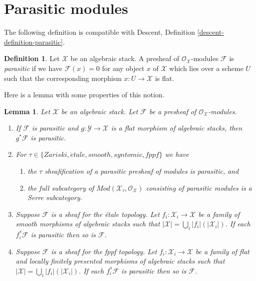 \documentclass{stacks-project}
\theoremstyle{plain}
\newtheorem{lemma}[subsection]{Lemma}
\theoremstyle{definition}
\newtheorem{definition}[subsection]{Definition}
\theoremstyle{remark}
\numberwithin{equation}{subsection}
\def\etale{{\acute{e}tale}}
\begin{document}
\section{Parasitic modules}
\label{section-parasitic}

\noindent
The following definition is compatible with
Descent, Definition \ref{descent-definition-parasitic}.

\begin{definition}
\label{definition-parasitic}
Let $\mathcal{X}$ be an algebraic stack.
A presheaf of $\mathcal{O}_\mathcal{X}$-modules $\mathcal{F}$ is
{\it parasitic} if we have $\mathcal{F}(x) = 0$ for any object $x$
of $\mathcal{X}$ which lies over a scheme $U$ such that the corresponding
morphism $x : U \to \mathcal{X}$ is flat.
\end{definition}

\noindent
Here is a lemma with some properties of this notion.

\begin{lemma}
\label{lemma-parasitic}
Let $\mathcal{X}$ be an algebraic stack. Let $\mathcal{F}$
be a presheaf of $\mathcal{O}_\mathcal{X}$-modules.
\begin{enumerate}
\item If $\mathcal{F}$ is parasitic and
$g : \mathcal{Y} \to \mathcal{X}$ is a flat morphism of algebraic stacks,
then $g^*\mathcal{F}$ is parasitic.
\item For $\tau \in \{Zariski, \etale, smooth, syntomic, fppf\}$
we have
\begin{enumerate}
\item the $\tau$ sheafification of a parasitic presheaf of modules is
parasitic, and
\item the full subcategory of
$\textit{Mod}(\mathcal{X}_\tau, \mathcal{O}_\mathcal{X})$
consisting of parasitic modules is a Serre subcategory.
\end{enumerate}
\item Suppose $\mathcal{F}$ is a sheaf for the \'etale topology.
Let $f_i : \mathcal{X}_i \to \mathcal{X}$ be a family of
smooth morphisms of algebraic stacks such that
$|\mathcal{X}| = \bigcup_i |f_i|(|\mathcal{X}_i|)$. If each
$f_i^*\mathcal{F}$ is parasitic then so is $\mathcal{F}$.
\item Suppose $\mathcal{F}$ is a sheaf for the fppf topology.
Let $f_i : \mathcal{X}_i \to \mathcal{X}$ be a family of
flat and locally finitely presented morphisms of algebraic stacks such that
$|\mathcal{X}| = \bigcup_i |f_i|(|\mathcal{X}_i|)$. If each
$f_i^*\mathcal{F}$ is parasitic then so is $\mathcal{F}$.
\end{enumerate}
\end{lemma}
\end{document}
